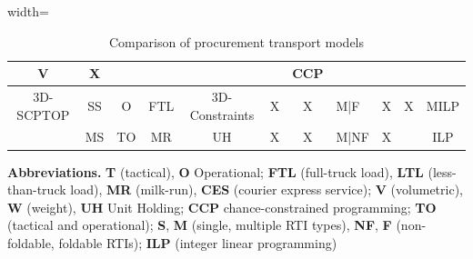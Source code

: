 \begin{table}[!ht]
\begin{adjustbox}{width=\textwidth}
\begin{tabular}{|c|c|c|c|c|c|c|l|c|c|c|}
      V                                                                                  &
      X                                                                                  &
                                                                                         &                &
                                                                                         &
                                                                                         &
      CCP                                                                                                                                               \\ \hline
      3D-SCPTOP                                                                          &
      SS                                                                                 &
      O                                                                                  &
      FTL                                                                                &
      3D-Constraints                                                                     &
      X                                                                                  &
      X                                                                                  & M|F            &
      X                                                                                  &
      X                                                                                  &
      MILP                                                                                                                                              \\ \hline
      \autocite{Zhang17012024}                                                           & MS             & TO & MR  & UH & X & X & M|NF & X &  & ILP   \\\hline
    \end{tabular}
  \end{adjustbox}
  \begin{tablenotes}
    \scriptsize
    \item  \textbf{Abbreviations.}  \textbf{T} (tactical), \textbf{O} Operational; \textbf{FTL} (full-truck load), \textbf{LTL} (less-than-truck load), \textbf{MR} (milk-run), \textbf{CES} (courier express service); \textbf{V} (volumetric), \textbf{W} (weight), \textbf{UH} Unit Holding;   \textbf{CCP} chance-constrained programming; \textbf{TO} (tactical and operational); \textbf{S}, \textbf{M} (single, multiple RTI types), \textbf{NF}, \textbf{F} (non-foldable, foldable RTIs); \textbf{ILP} (integer linear programming)
  \end{tablenotes}
  \caption{Comparison of procurement transport models}
  \label{table:ComProTra}
\end{table}


